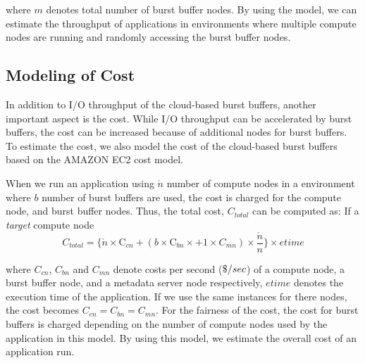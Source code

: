 where $m$ denotes total number of burst buffer nodes. 
By using the model, we can estimate the throughput of applications in
environments where multiple compute nodes are running and randomly accessing the
burst buffer nodes.


\subsection{Modeling of Cost}
\label{ssec:cost_model}
In addition to I/O throughput of the cloud-based burst buffers, another
important aspect is the cost.
While I/O throughput can be accelerated by burst buffers, the cost can be
increased because of additional nodes for burst buffers.
To estimate the cost, we also model the cost of the cloud-based burst buffers
based on the AMAZON EC2 cost model.

When we run an application using $\acute{n}$ number of compute nodes in a
environment where $b$ number of burst buffers are used, the cost is charged for
the compute node, and burst buffer nodes.
Thus, the total cost, $C_{total}$ can be computed as:   If a \emph{target}
compute node
\begin{equation}
C_{total} = \{　\acute{n} \times \text{C}_{cn}+ (b \times \text{C}_{bn} \times
+ 1 \times C_{mn}) \times \frac{\acute{n}}{n} \}\times etime
\end{equation}

where $C_{cn}$, $C_{bn}$ and $C_{mn}$ denote costs per second (${\it \$} /sec$)
of a compute node, a burst buffer node, and a metadata server node
respectively, $etime$ denotes the execution time of the application. If we
use the same instances for there nodes, the cost becomes
$C_{cn}=C_{bn}=C_{mn}$.
For the fairness of the cost, the cost for burst buffers is charged depending on the number of compute nodes used by the application in this model. By using this
model, we estimate the overall cost of an application run.


